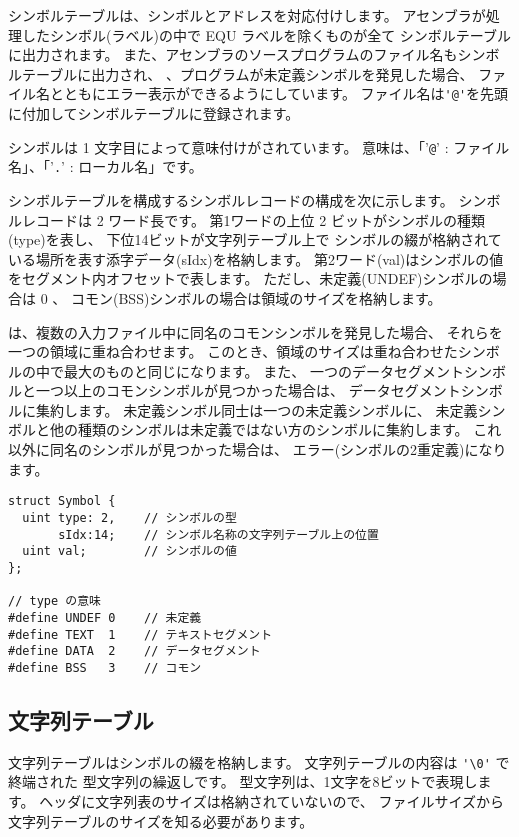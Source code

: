シンボルテーブルは、シンボルとアドレスを対応付けします。
アセンブラが処理したシンボル(ラベル)の中で EQU ラベルを除くものが全て
シンボルテーブルに出力されます。
また、アセンブラのソースプログラムのファイル名もシンボルテーブルに出力され、
{\objexe}、{\objbin}プログラムが未定義シンボルを発見した場合、
ファイル名とともにエラー表示ができるようにしています。
ファイル名は\verb/'@'/を先頭に付加してシンボルテーブルに登録されます。

シンボルは 1 文字目によって意味付けがされています。
意味は、「'\verb/@/' : ファイル名」、「'\verb/./' : ローカル名」です。

シンボルテーブルを構成するシンボルレコードの構成を次に示します。
シンボルレコードは 2 ワード長です。
第1ワードの上位 2 ビットがシンボルの種類(type)を表し、
下位14ビットが文字列テーブル上で
シンボルの綴が格納されている場所を表す添字データ(sIdx)を格納します。
第2ワード(val)はシンボルの値をセグメント内オフセットで表します。
ただし、未定義(UNDEF)シンボルの場合は 0 、
コモン(BSS)シンボルの場合は領域のサイズを格納します。

{\ld}は、複数の入力ファイル中に同名のコモンシンボルを発見した場合、
それらを一つの領域に重ね合わせます。
このとき、領域のサイズは重ね合わせたシンボルの中で最大のものと同じになります。
また、
一つのデータセグメントシンボルと一つ以上のコモンシンボルが見つかった場合は、
データセグメントシンボルに集約します。
未定義シンボル同士は一つの未定義シンボルに、
未定義シンボルと他の種類のシンボルは未定義ではない方のシンボルに集約します。
これ以外に同名のシンボルが見つかった場合は、
エラー(シンボルの2重定義)になります。

\begin{mylist}
\begin{verbatim}
struct Symbol {
  uint type: 2,    // シンボルの型
       sIdx:14;    // シンボル名称の文字列テーブル上の位置
  uint val;        // シンボルの値
};

// type の意味
#define UNDEF 0    // 未定義
#define TEXT  1    // テキストセグメント
#define DATA  2    // データセグメント
#define BSS   3    // コモン
\end{verbatim}
\end{mylist}

\subsection{文字列テーブル}

文字列テーブルはシンボルの綴を格納します。
文字列テーブルの内容は \verb/'\0'/ で終端された \cmml 型文字列の繰返しです。
\cmml 型文字列は、1文字を8ビットで表現します。
ヘッダに文字列表のサイズは格納されていないので、
ファイルサイズから文字列テーブルのサイズを知る必要があります。

